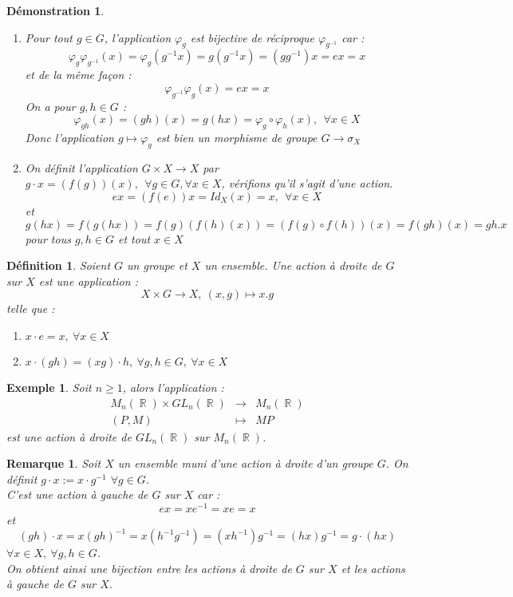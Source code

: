 \documentclass[a4paper, oneside]{report}
\theoremstyle{break}
\newtheorem{defi}[thm]{Définition}
\newtheorem{exem}[thm]{Exemple}
\newtheorem{remar}[thm]{Remarque}
\newtheorem*{demo}{Démonstration}
\newcommand{\x}{\times}
\DeclareMathOperator{\R}{\mathbb{R}}
\begin{document}
\begin{demo}
	\begin{enumerate}
		\item Pour tout $g\in G$, l'application $\varphi_g$ est bijective de réciproque $\varphi_{g^{-1}}$ car :
		$$\varphi_g\varphi_{g^{-1}}(x)=\varphi_g(g^{-1}x)=g(g^{-1}x)=(gg^{-1})x=ex=x$$
		et de la même façon :
		$$\varphi_{g^{-1}}\varphi_g(x)=ex=x$$
		On a pour $g,h\in G$ :
		$$\varphi_{gh}(x)=(gh)(x)=g(hx)=\varphi_g\circ \varphi_h(x),~~\forall x\in X$$
		Donc l'application $g\mapsto \varphi_g$ est bien un morphisme de groupe $G\rightarrow \sigma_X$
		\item On définit l'application $G\x X \rightarrow X$ par $g \cdot x = (f(g))(x),~~\forall g\in G,\forall x\in X$, vérifions qu'il s'agit d'une action.\\
		$$ex=(f(e))x=Id_X(x)=x,~~\forall x\in X$$
		et 
		$$g(hx)=f(g(hx))=f(g)(f(h)(x))=(f(g)\circ f(h) )(x)=f(gh)(x)=gh.x$$
		pour tous $g,h\in G$ et tout $x\in X$
	\end{enumerate}
\end{demo}


\begin{defi}
	Soient $G$ un groupe et $X$ un ensemble. Une action à droite de $G$ sur $X$ est une application :
	$$X\x G\rightarrow X,~(x,g)\mapsto x.g$$
	telle que :
	\begin{enumerate}
		\item $x \cdot e=x,~\forall x\in X$
		\item $x \cdot (gh)=(xg) \cdot h,~\forall g,h\in G,~\forall x\in X$
	\end{enumerate}
\end{defi}

\begin{exem}
	Soit $n\geq 1$, alors l'application :
	$$\begin{array}{lll}
	M_n(\R)\x GL_n(\R)&\rightarrow & M_n(\R)\\
	(P,M)&\mapsto & MP
	\end{array}$$
	est une action à droite de $GL_n(\R)$ sur $M_n(\R)$.
\end{exem}

\begin{remar}
	Soit $X$ un ensemble muni d'une action à droite d'un groupe $G$. On définit $g \cdot x := x \cdot g^{-1}$ $\forall g\in G$.\\
	C'est une action à gauche de $G$ sur $X$ car :
	$$ex=xe^{-1}=xe=x$$
	et 
	$$(gh) \cdot x=x(gh)^{-1}=x(h^{-1}g^{-1})=(xh^{-1})g^{-1}=(hx)g^{-1}=g \cdot (hx)$$
	$\forall x\in X, ~\forall g,h\in G$.\\
	On obtient ainsi une bijection entre les actions à droite de $G$ sur $X$ et les actions à gauche de $G$ sur $X$.
\end{remar}
\end{document}
